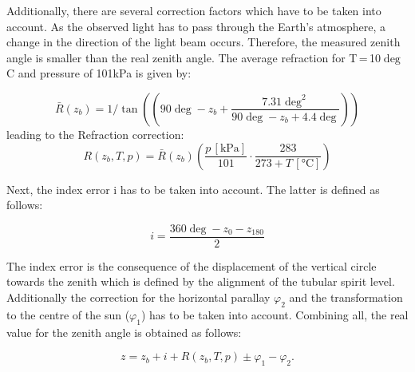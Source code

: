Additionally, there are several correction factors which have to be taken into account. As the observed light has to pass through the Earth's atmosphere, a change in the direction of the light beam occurs. Therefore, the measured zenith angle is smaller than the real zenith angle. The average refraction for T\,=\,10$\deg$C and pressure of 101kPa is given by:

\begin{equation}
    \bar{R}(z_b) = 1/\tan((90 \deg - z_b + \frac{7.31 \deg^2}{90\deg - z_b + 4.4 \deg}))
\end{equation}
 leading to the Refraction correction: 
\begin{equation}
    R(z_b, T, p) = \bar{R}(z_b) \left( \frac{p\, [\si{\kPa}]}{101} \cdot \frac{283}{273 + T\, [\si{\celsius}]} \right)
\end{equation}

Next, the index error i has to be taken into account. The latter is defined as follows:

\begin{equation}
    i = \frac{360 \deg - z_0 - z_{180}}{2}
\end{equation}

The index error is the consequence of the displacement of the
vertical circle towards the zenith which is defined by the alignment of
the tubular spirit level. Additionally the correction for the horizontal parallay $\varphi_2$ and the transformation to the centre of the sun ($\varphi_1$) has to be taken into account. Combining all, the real value for the zenith angle is obtained as follows:

\begin{equation}
    \boxed{
        z = z_b + i + R(z_b, T, p) \pm \varphi_1
- \varphi_2    }. 
\end{equation}